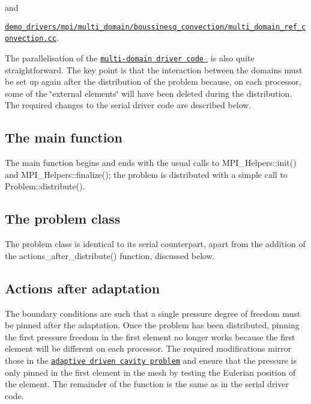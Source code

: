 and

\begin{center} \href{../../../../demo_drivers/mpi/multi_domain/boussinesq_convection/multi_domain_ref_b_convection.cc}{\tt {\ttfamily demo\+\_\+drivers/mpi/multi\+\_\+domain/boussinesq\+\_\+convection/multi\+\_\+domain\+\_\+ref\+\_\+convection.\+cc}}. \end{center} 

The parallelisation of the \href{../../../multi_physics/multi_domain_ref_b_convect/html/index.html}{\tt multi-\/domain driver code } is also quite straightforward. The key point is that the interaction between the domains must be set up again after the distribution of the problem because, on each processor, some of the \char`\"{}external elements\char`\"{} will have been deleted during the distribution. The required changes to the serial driver code are described below.\hypertarget{index_main_body}{}\subsection{The main function}\label{index_main_body}
The main function begins and ends with the usual calls to {\ttfamily M\+P\+I\+\_\+\+Helpers\+::init()} and {\ttfamily M\+P\+I\+\_\+\+Helpers\+::finalize()}; the problem is distributed with a simple call to {\ttfamily Problem\+::distribute()}.



\hypertarget{index_problem_class}{}\subsection{The problem class}\label{index_problem_class}
The problem class is identical to its serial counterpart, apart from the addition of the {\ttfamily actions\+\_\+after\+\_\+distribute()} function, discussed below.



\hypertarget{index_actions_after_adapt}{}\subsection{Actions after adaptation}\label{index_actions_after_adapt}
The boundary conditions are such that a single pressure degree of freedom must be pinned after the adaptation. Once the problem has been distributed, pinning the first pressure freedom in the first element no longer works because the first element will be different on each processor. The required modifications mirror those in the \href{../../adaptive_driven_cavity/html/index.html}{\tt adaptive driven cavity problem} and ensure that the pressure is only pinned in the first element in the mesh by testing the Eulerian position of the element. The remainder of the function is the same as in the serial driver code.

